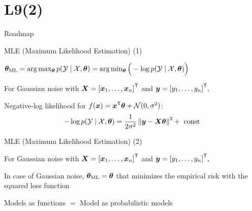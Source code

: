 \documentclass[handout,fleqn,aspectratio=169]{beamer}
\begin{document}
\section{L9(2)}
\begin{frame}{Roadmap}

\plitemsep 0.1in

\bce[(1)] 

\item  {}
\item  {} 
\item  {}

\ece
\end{frame}


\begin{frame}{MLE (Maximum Likelihood Estimation) (1)}

\plitemsep 0.1in

\bci 

\item $\bm{\theta}_{\text{ML}} = \arg \max_{\bm{\theta}} p({\cal Y} \mid {\cal X}, \bm{\theta}) = \arg \min_{\bm{\theta}} \Big( -\log p({\cal Y} \mid {\cal X}, \bm{\theta}) \Big)$ 
\item For Gaussian noise with $\bm{X} = {[\bm{x}_1, \ldots, \bm{x}_n]}^{\mathsf{T}}$ and $\bm{y} = {[y_1, \ldots, y_n]}^{\mathsf{T}},$

\mycolorbox
{
Negative-log likelihood for $f(\bm{x}) = {\bm{x}}^{\mathsf{T}}\bm{\theta} + \mathcal N(0,\sigma^2)$:
\vspace{-0.1cm}
$$
-\log p({\cal Y} \mid {\cal X}, \bm{\theta}) = \frac{1}{2\sigma^2} \left \lVert \bm{y} - \bm{X} \bm{\theta} \right \rVert^2 + \ \text{const}
$$
}
\eci
\end{frame}


\begin{frame}{MLE (Maximum Likelihood Estimation) (2)}

\plitemsep 0.2in

\bci 

\item For Gaussian noise with $\bm{X} = {[\bm{x}_1, \ldots, \bm{x}_n]}^{\mathsf{T}}$ and $\bm{y} = {[y_1, \ldots, y_n]}^{\mathsf{T}},$

\item In case of Gaussian noise, $\bm{\theta}_{\text{ML}}= \bm{\theta}$ that minimizes the empirical risk with the squared loss function
\bci
\item Models as functions $=$ Model as probabilistic models
\eci

\eci
\end{frame}
\end{document}
